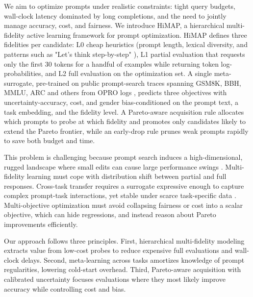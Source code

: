 \documentclass{article}
\begin{document}
We aim to optimize prompts under realistic constraints: tight query budgets, wall-clock latency dominated by long completions, and the need to jointly manage accuracy, cost, and fairness. We introduce HiMAP, a hierarchical multi-fidelity active learning framework for prompt optimization. HiMAP defines three fidelities per candidate: L0 cheap heuristics (prompt length, lexical diversity, and patterns such as "Let's think step-by-step" \cite{kojima-2022-large}), L1 partial evaluation that requests only the first 30 tokens for a handful of examples while returning token log-probabilities, and L2 full evaluation on the optimization set. A single meta-surrogate, pre-trained on public prompt-search traces spanning GSM8K, BBH, MMLU, ARC and others from OPRO logs \cite{yang-2023-large}, predicts three objectives with uncertainty-accuracy, cost, and gender bias-conditioned on the prompt text, a task embedding, and the fidelity level. A Pareto-aware acquisition rule allocates which prompts to probe at which fidelity and promotes only candidates likely to extend the Pareto frontier, while an early-drop rule prunes weak prompts rapidly to save both budget and time.

This problem is challenging because prompt search induces a high-dimensional, rugged landscape where small edits can cause large performance swings \cite{arora-2022-ask}. Multi-fidelity learning must cope with distribution shift between partial and full responses. Cross-task transfer requires a surrogate expressive enough to capture complex prompt-task interactions, yet stable under scarce task-specific data \cite{phang-2022-hypertuning}. Multi-objective optimization must avoid collapsing fairness or cost into a scalar objective, which can hide regressions, and instead reason about Pareto improvements efficiently.

Our approach follows three principles. First, hierarchical multi-fidelity modeling extracts value from low-cost probes to reduce expensive full evaluations and wall-clock delays. Second, meta-learning across tasks amortizes knowledge of prompt regularities, lowering cold-start overhead. Third, Pareto-aware acquisition with calibrated uncertainty focuses evaluations where they most likely improve accuracy while controlling cost and bias.
\end{document}
